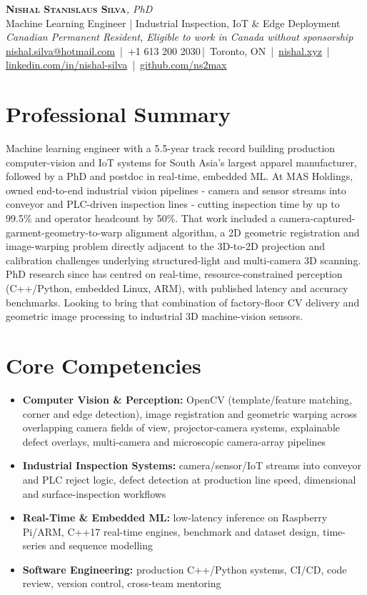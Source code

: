 \documentclass[11pt]{article}
\makeatletter
\newcommand{\cvName}{Nishal Stanislaus Silva}
\newcommand{\cvEmail}{nishal.silva@hotmail.com}
\newcommand{\cvPhone}{+1 613 200 2030}
\newcommand{\cvCity}{Toronto, ON}
\newcommand{\cvSite}{https://nishal.xyz}
\newcommand{\cvLinkedIn}{https://www.linkedin.com/in/nishal-silva}
\newcommand{\cvGitHub}{https://github.com/ns2max}
\newcommand{\cvStatus}{Canadian Permanent Resident, Eligible to work in Canada without sponsorship}
\newcommand{\cvTagline}{Machine Learning Engineer | Industrial Inspection, IoT \& Edge Deployment}
\makeatother
\begin{document}
\pagestyle{empty}
\begin{center}
    {\LARGE \scshape \textbf{\cvName}}{\large \textit{, PhD}}\\[1pt]
    {\small \cvTagline}\\[1pt]
    {\footnotesize\textit{\cvStatus}}\\[1pt]
    {\small
    \href{mailto:\cvEmail}{\cvEmail} \,|\, \cvPhone \,|\, \cvCity
    \,|\, \href{\cvSite}{nishal.xyz} \,|\, \href{\cvLinkedIn}{linkedin.com/in/nishal-silva}
    \,|\, \href{\cvGitHub}{github.com/ns2max}}
\end{center}

\section*{Professional Summary}
Machine learning engineer with a 5.5-year track record building production computer-vision and IoT
systems for South Asia's largest apparel manufacturer, followed by a PhD and postdoc in real-time,
embedded ML. At MAS Holdings, owned end-to-end industrial vision pipelines - camera and sensor
streams into conveyor and PLC-driven inspection lines - cutting inspection time by up to 99.5\% and
operator headcount by 50\%. That work included a camera-captured-garment-geometry-to-warp alignment
algorithm, a 2D geometric registration and image-warping problem directly adjacent to the 3D-to-2D
projection and calibration challenges underlying structured-light and multi-camera 3D scanning. PhD
research since has centred on real-time, resource-constrained perception (C++/Python, embedded
Linux, ARM), with published latency and accuracy benchmarks. Looking to bring that combination of
factory-floor CV delivery and geometric image processing to industrial 3D machine-vision sensors.

\section*{Core Competencies}
\begin{itemize}[leftmargin=1.5em, itemsep=-0.2em, topsep=0.2em]
    \item \textbf{Computer Vision \& Perception:} OpenCV (template/feature matching, corner and
    edge detection), image registration and geometric warping across overlapping camera fields of
    view, projector-camera systems, explainable defect overlays, multi-camera and microscopic
    camera-array pipelines
    \item \textbf{Industrial Inspection Systems:} camera/sensor/IoT streams into conveyor and PLC
    reject logic, defect detection at production line speed, dimensional and surface-inspection
    workflows
    \item \textbf{Real-Time \& Embedded ML:} low-latency inference on Raspberry Pi/ARM, C++17
    real-time engines, benchmark and dataset design, time-series and sequence modelling
    \item \textbf{Software Engineering:} production C++/Python systems, CI/CD, code review,
    version control, cross-team mentoring
\end{itemize}
\end{document}
